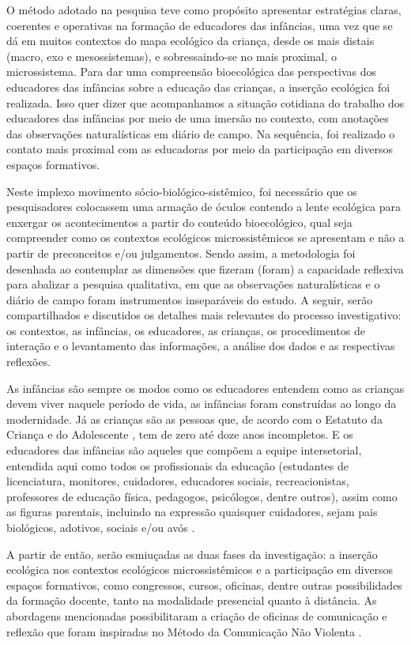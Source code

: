 \documentclass{textolivre}
\begin{document}
O método adotado na pesquisa teve como propósito apresentar estratégias claras, coerentes e operativas na formação de educadores das infâncias, uma vez que se dá em muitos contextos do mapa ecológico da criança, desde os mais distais (macro, exo e mesossistemas), e sobressaindo-se no mais proximal, o microssistema. Para dar uma compreensão bioecológica das perspectivas dos educadores das infâncias sobre a educação das crianças, a inserção ecológica foi realizada. Isso quer dizer que acompanhamos a situação cotidiana do trabalho dos educadores das infâncias por meio de uma imersão no contexto, com anotações das observações naturalísticas em diário de campo. Na sequência, foi realizado o contato mais proximal com as educadoras por meio da participação em diversos espaços formativos.  

Neste implexo movimento sócio-biológico-sistêmico, foi necessário que os pesquisadores colocassem uma armação de óculos contendo a lente ecológica para enxergar os acontecimentos a partir do conteúdo bioecológico, qual seja compreender como os contextos ecológicos microssistêmicos se apresentam e não a partir de preconceitos e/ou julgamentos. Sendo assim, a metodologia foi desenhada ao contemplar as dimensões que fizeram (foram) a capacidade reflexiva para abalizar a pesquisa qualitativa, em que as observações naturalísticas e o diário de campo foram instrumentos inseparáveis do estudo. A seguir, serão compartilhados e discutidos os detalhes mais relevantes do processo investigativo: os contextos, as infâncias, os educadores, as crianças, os procedimentos de interação e o levantamento das informações, a análise dos dados e as respectivas reflexões.

As infâncias são sempre os modos como os educadores entendem como as crianças devem viver naquele período de vida, as infâncias foram construídas ao longo da modernidade. Já as crianças são as pessoas que, de acordo com o Estatuto da Criança e do Adolescente \cite{eca1990}, tem de zero até doze anos incompletos. E os educadores das infâncias são aqueles que compõem a equipe intersetorial, entendida aqui como todos os profissionais da educação (estudantes de licenciatura, monitores, cuidadores, educadores sociais, recreacionistas, professores de educação física, pedagogos, psicólogos, dentre outros), assim como as figuras parentais, incluindo na expressão quaisquer cuidadores, sejam pais biológicos, adotivos, sociais e/ou avós \cite{piske2019}.

A partir de então, serão esmiuçadas as duas fases da investigação: a inserção ecológica nos contextos ecológicos microssistêmicos \cite{piske2018c,koller2016,silveira2009} e a participação em diversos espaços formativos, como congressos, cursos, oficinas, dentre outras possibilidades da formação docente, tanto na modalidade presencial quanto à distância. As abordagens mencionadas possibilitaram a criação de oficinas de comunicação e reflexão que foram inspiradas no Método da Comunicação Não Violenta \cite{rosenberg2006}. 
\end{document}
